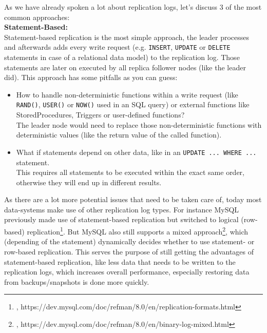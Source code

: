 {
As we have already spoken a lot about replication logs, let's discuss 3 of the most common approaches:\\

\textbf{Statement-Based:}\\
Statement-based replication is the most simple approach, the leader processes and afterwards adds every write request (e.g. \lstinline{INSERT}, \lstinline{UPDATE} or \lstinline{DELETE} statements in case of a relational data model) to the replication log. Those statements are later on executed by all replica follower nodes (like the leader did). This approach has some pitfalls as you can guess:\\
\begin{itemize}
\item How to handle non-deterministic functions within a write request (like \lstinline{RAND()}, \lstinline{USER()} or \lstinline{NOW()} used in an SQL query) or external functions like StoredProcedures, Triggers or user-defined functions?\\
The leader node would need to replace those non-deterministic functions with deterministic values (like the return value of the called function).
\item What if statements depend on other data, like in an \lstinline{UPDATE ... WHERE ...} statement. \\
This requires all statements to be executed within the exact same order, otherwise they will end up in different results.\\
\end{itemize}
As there are a lot more potential issues that need to be taken care of, today most data-systems make use of other replication log types. For instance MySQL previously made use of statement-based replication but switched to logical (row-based) replication\footnote{\cite{MYSQLRF}, https://dev.mysql.com/doc/refman/8.0/en/replication-formats.html}. But MySQL also still supports a mixed approach\footnote{\cite{MYSQLMR}, https://dev.mysql.com/doc/refman/8.0/en/binary-log-mixed.html}, which (depending of the statement) dynamically decides whether to use statement- or row-based replication. This serves the purpose of still getting the advantages of statement-based replication, like less data that needs to be written to the replication logs, which increases overall performance, especially restoring data from backups/snapshots is done more quickly.\\

}
